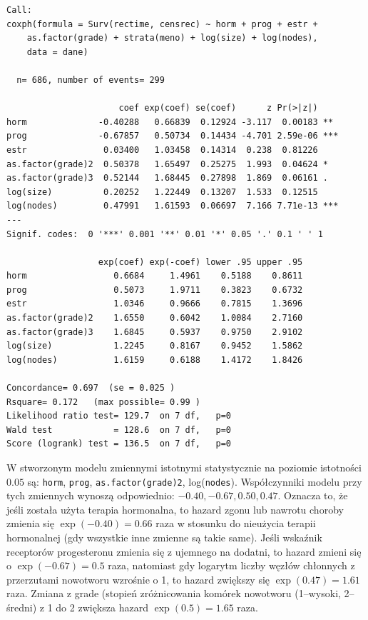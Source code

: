 \documentclass[]{article}
\begin{document}
\begin{verbatim}
Call:
coxph(formula = Surv(rectime, censrec) ~ horm + prog + estr + 
    as.factor(grade) + strata(meno) + log(size) + log(nodes), 
    data = dane)

  n= 686, number of events= 299 

                      coef exp(coef) se(coef)      z Pr(>|z|)    
horm              -0.40288   0.66839  0.12924 -3.117  0.00183 ** 
prog              -0.67857   0.50734  0.14434 -4.701 2.59e-06 ***
estr               0.03400   1.03458  0.14314  0.238  0.81226    
as.factor(grade)2  0.50378   1.65497  0.25275  1.993  0.04624 *  
as.factor(grade)3  0.52144   1.68445  0.27898  1.869  0.06161 .  
log(size)          0.20252   1.22449  0.13207  1.533  0.12515    
log(nodes)         0.47991   1.61593  0.06697  7.166 7.71e-13 ***
---
Signif. codes:  0 '***' 0.001 '**' 0.01 '*' 0.05 '.' 0.1 ' ' 1

                  exp(coef) exp(-coef) lower .95 upper .95
horm                 0.6684     1.4961    0.5188    0.8611
prog                 0.5073     1.9711    0.3823    0.6732
estr                 1.0346     0.9666    0.7815    1.3696
as.factor(grade)2    1.6550     0.6042    1.0084    2.7160
as.factor(grade)3    1.6845     0.5937    0.9750    2.9102
log(size)            1.2245     0.8167    0.9452    1.5862
log(nodes)           1.6159     0.6188    1.4172    1.8426

Concordance= 0.697  (se = 0.025 )
Rsquare= 0.172   (max possible= 0.99 )
Likelihood ratio test= 129.7  on 7 df,   p=0
Wald test            = 128.6  on 7 df,   p=0
Score (logrank) test = 136.5  on 7 df,   p=0
\end{verbatim}

W stworzonym modelu zmiennymi istotnymi statystycznie na poziomie
istotności \(0.05\) są: \texttt{horm}, \texttt{prog},
\texttt{as.factor(grade)2}, log(\texttt{nodes}). Współczynniki modelu
przy tych zmiennych wynoszą odpowiednio: \(-0.40, -0.67, 0.50, 0.47\).
Oznacza to, że jeśli została użyta terapia hormonalna, to hazard zgonu
lub nawrotu choroby zmienia się \(\exp(-0.40)=0.66\) raza w stosunku do
nieużycia terapii hormonalnej (gdy wszystkie inne zmienne są takie
same). Jeśli wskaźnik receptorów progesteronu zmienia się z ujemnego na
dodatni, to hazard zmieni się o \(\exp(-0.67)=0.5\) raza, natomiast gdy
logarytm liczby węzłów chłonnych z przerzutami nowotworu wzrośnie o 1,
to hazard zwiększy się \(\exp(0.47)=1.61\) raza. Zmiana z grade (stopień
zróżnicowania komórek nowotworu (1--wysoki, 2--średni) z 1 do 2 zwiększa
hazard \(\exp(0.5)=1.65\) raza.
\end{document}
